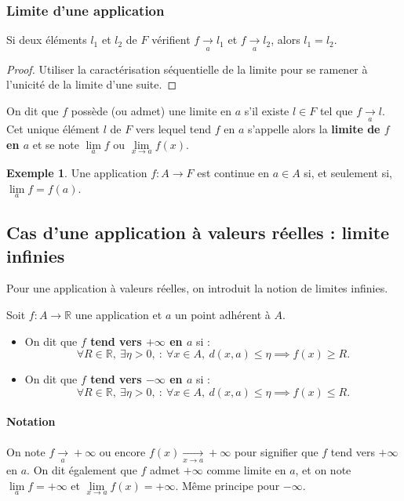 \documentclass[french]{article}
\newcommand{\R}{\mathbb{R}}
\theoremstyle{plain}
\theoremstyle{definition}
\newtheorem*{ex}{Exemple}
\theoremstyle{remark}
\begin{document}
\subsubsection*{Limite d'une application}

\begin{thm}
	Si deux éléments $l_1$ et $l_2$ de $F$ vérifient $f\xrightarrow[a]{}l_1$ et $f\xrightarrow[a]{}l_2$, alors $l_1=l_2$.
\end{thm}
\begin{proof}
	Utiliser la caractérisation séquentielle de la limite pour se ramener à l'unicité de la limite d'une suite.
\end{proof}

\begin{dfn}
	On dit que $f$ possède (ou admet) une limite en $a$ s'il existe $l\in F$ tel que $f\xrightarrow[a]{}l$. Cet unique élément $l$ de $F$ vers lequel tend $f$ en $a$ s'appelle alors la \textbf{limite de $f$ en $a$} et se note $\underset{a}{\lim}f$ ou $\underset{x\to a}{\lim}f(x)$.
\end{dfn}

\begin{ex}
	Une application $f:A\to F$ est continue en $a\in A$ si, et seulement si, $\underset{a}{\lim}f=f(a)$.
\end{ex}

\subsection{Cas d'une application à valeurs réelles : limite infinies}

Pour une application à valeurs réelles, on introduit la notion de limites infinies.

\begin{dfn}
	Soit $f:A\to\R$ une application et $a$ un point adhérent à $A$.
	\begin{itemize}
		\item On dit que \textbf{$f$ tend vers $+\infty$ en $a$} si :
		$$\forall R\in\R,\ \exists\eta>0,\ :\ \forall x\in A,\ d(x,a)\leqslant\eta\implies f(x)\geqslant R.$$
		\item On dit que \textbf{$f$ tend vers $-\infty$ en $a$} si :
		$$\forall R\in\R,\ \exists\eta>0,\ :\ \forall x\in A,\ d(x,a)\leqslant\eta\implies f(x)\leqslant R.$$
	\end{itemize}
\end{dfn}

\paragraph{Notation} On note $f\xrightarrow[a]{}+\infty$ ou encore $f(x)\xrightarrow[x\to a]{}+\infty$ pour signifier que $f$ tend vers $+\infty$ en $a$. On dit également que $f$ admet $+\infty$ comme limite en $a$, et on note $\underset{a}{\lim}f=+\infty$ et $\underset{x\to a}{\lim}f(x)=+\infty$. Même principe pour $-\infty$.
\end{document}
